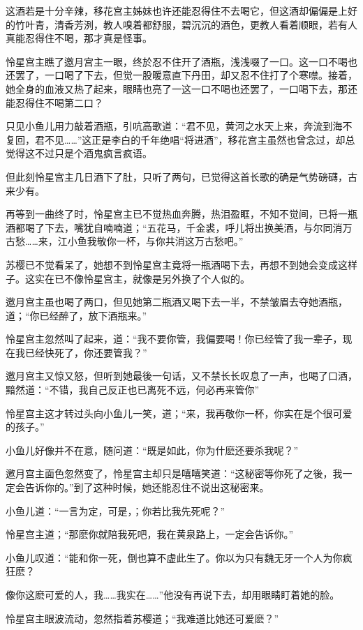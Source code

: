 \documentclass[12pt,oneside]{book}
\begin{document}
这酒若是十分辛辣，移花宫主姊妹也许还能忍得住不去喝它，但这酒却偏偏是上好的竹叶青，清香芳洌，教人嗅着都舒服，碧沉沉的酒色，更教人看着顺眼，若有人真能忍得住不喝，那才真是怪事。

怜星宫主瞧了邀月宫主一眼，终於忍不住开了酒瓶，浅浅啜了一口。这一口不喝也还罢了，一口喝了下去，但觉一股暖意直下丹田，却又忍不住打了个寒噤。接着，她全身的血液又热了起来，眼睛也亮了一这一口不喝也还罢了，一口喝下去，那还能忍得住不喝第二口？

只见小鱼儿用力敲着酒瓶，引吭高歌道：``君不见，黄河之水天上来，奔流到海不复回，君不见\ldots\ldots{}''这正是李白的千年绝唱``将进酒''，移花宫主虽然也曾念过，却总觉得这不过只是个酒鬼疯言疯语。

但此刻怜星宫主几日酒下了肚，只听了两句，已觉得这首长歌的确是气势磅礴，古来少有。

再等到一曲终了时，怜星宫主已不觉热血奔腾，热泪盈眶，不知不觉间，已将一瓶酒都喝了下去，嘴犹自喃喃道；``五花马，千金裘，呼儿将出换美酒，与尔同消万古愁\ldots\ldots 来，江小鱼我敬你一杯，与你共消这万古愁吧。''

苏樱已不觉看呆了，她想不到怜星宫主竟将一瓶酒喝下去，再想不到她会变成这样子。这实在已不像怜星宫主，就像是另外换了个人似的。

邀月宫主虽也喝了两口，但见她第二瓶酒又喝下去一半，不禁皱眉去夺她酒瓶，道；``你已经醉了，放下酒瓶来。''

怜星宫主忽然叫了起来，道：``我不要你管，我偏要喝！你已经管了我一辈子，现在我已经快死了，你还要管我？''

邀月宫主又惊又怒，但听到她最後一句话，又不禁长长叹息了一声，也喝了口酒，黯然道：``不错，我自己反正也已离死不远，何必再来管你''

怜星宫主这才转过头向小鱼儿一笑，道；``来，我再敬你一杯，你实在是个很可爱的孩子。''

小鱼儿好像并不在意，随问道：``既是如此，你为什麽还要杀我呢？''

邀月宫主面色忽然变了，怜星宫主却只是嘻嘻笑道：``这秘密等你死了之後，我一定会告诉你的。''到了这种时候，她还能忍住不说出这秘密来。

小鱼儿道：``一言为定，可是，；你若比我先死呢？''

怜星宫主道；``那麽你就陪我死吧，我在黄泉路上，一定会告诉你。''

小鱼儿叹道：``能和你一死，倒也算不虚此生了。你以为只有魏无牙一个人为你疯狂麽？

像你这麽可爱的人，我\ldots\ldots 我实在\ldots\ldots''他没有再说下去，却用眼睛盯着她的脸。

怜星宫主眼波流动，忽然指着苏樱道；``我难道比她还可爱麽？''
\end{document}
